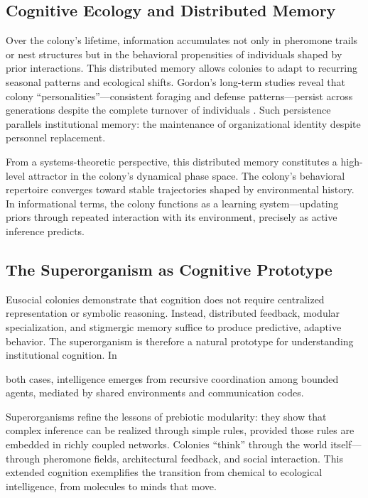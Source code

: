\documentclass[11pt,a4paper]{article}
\begin{document}
\subsection{Cognitive Ecology and Distributed Memory}

Over the colony’s lifetime, information accumulates not only in pheromone trails or nest structures but in the behavioral propensities of individuals shaped by prior interactions.  This distributed memory allows colonies to adapt to recurring seasonal patterns and ecological shifts.  Gordon’s long-term studies reveal that colony “personalities”—consistent foraging and defense patterns—persist across generations despite the complete turnover of individuals \citep{Gordon2010AntEncounters}.  Such persistence parallels institutional memory: the maintenance of organizational identity despite personnel replacement.

From a systems-theoretic perspective, this distributed memory constitutes a high-level attractor in the colony’s dynamical phase space.  The colony’s behavioral repertoire converges toward stable trajectories shaped by environmental history.  In informational terms, the colony functions as a learning system—updating priors through repeated interaction with its environment, precisely as active inference predicts.

\subsection{The Superorganism as Cognitive Prototype}

Eusocial colonies demonstrate that cognition does not require centralized representation or symbolic reasoning.  Instead, distributed feedback, modular specialization, and stigmergic memory suffice to produce predictive, adaptive behavior.  The superorganism is therefore a natural prototype for understanding institutional cognition.  In

 both cases, intelligence emerges from recursive coordination among bounded agents, mediated by shared environments and communication codes.

Superorganisms refine the lessons of prebiotic modularity: they show that complex inference can be realized through simple rules, provided those rules are embedded in richly coupled networks.  Colonies “think” through the world itself—through pheromone fields, architectural feedback, and social interaction.  This extended cognition exemplifies the transition from chemical to ecological intelligence, from molecules to minds that move.
\end{document}
